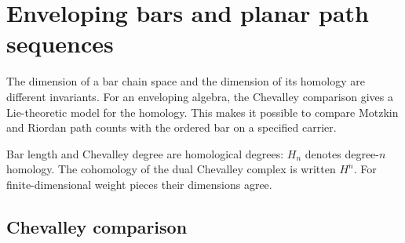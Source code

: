 \chapter{Enveloping bars and planar path sequences}
\label{ch:enveloping-obstructions}

The dimension of a bar chain space and the dimension of its homology are different invariants. For an enveloping algebra, the Chevalley comparison gives a Lie-theoretic model for the homology. This makes it possible to compare Motzkin and Riordan path counts with the ordered bar on a specified carrier.

Bar length and Chevalley degree are homological degrees: $H_n$ denotes degree-$n$ homology. The cohomology of the dual Chevalley complex is written $H^n$. For finite-dimensional weight pieces their dimensions agree.

\section{Chevalley comparison}

